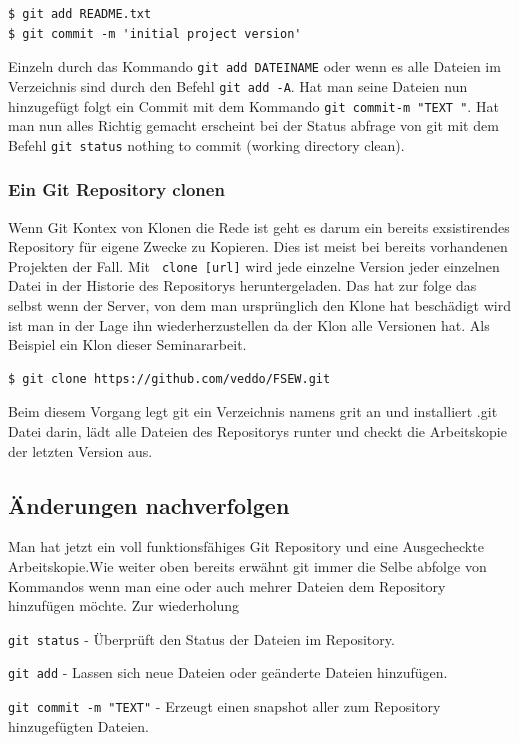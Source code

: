 \documentclass[12pt,a4paper,bibliography=totocnumbered,listof=totocnumbered]{scrartcl}
\begin{document}
 \vspace{1em}
\begin{lstlisting}[caption=Git Repository Dateien hinzufügen, label=lst:arduino]
$ git add README.txt
$ git commit -m 'initial project version'

\end{lstlisting}


Einzeln durch das Kommando \lstinline|git add DATEINAME| oder wenn es alle Dateien im Verzeichnis sind durch den Befehl \lstinline|git add -A|. Hat man seine Dateien nun hinzugefügt folgt ein Commit mit dem Kommando \lstinline|git commit-m "TEXT "|. Hat man nun alles Richtig gemacht erscheint bei der Status abfrage von git mit dem Befehl \lstinline|git status| nothing to commit (working directory clean).


\subsubsection{Ein Git Repository clonen}
Wenn Git Kontex von Klonen die Rede ist geht es darum ein bereits exsistirendes Repository für eigene Zwecke zu Kopieren. Dies ist meist bei bereits vorhandenen Projekten der Fall. Mit \lstinline| clone [url]| wird jede einzelne Version jeder einzelnen Datei in der Historie des Repositorys heruntergeladen. Das hat zur folge das selbst wenn der Server, von dem man ursprünglich den Klone hat beschädigt wird ist man in der Lage ihn wiederherzustellen da der Klon alle Versionen hat. Als Beispiel ein Klon dieser Seminararbeit.

    \vspace{1em}
\begin{lstlisting}[caption=Git Repository Klonen, label=lst:arduino]
$ git clone https://github.com/veddo/FSEW.git
\end{lstlisting}

Beim diesem Vorgang legt git ein Verzeichnis namens grit an und installiert .git Datei darin, lädt alle Dateien des Repositorys runter und checkt die Arbeitskopie der letzten Version aus.




\subsection{ Änderungen nachverfolgen}
 Man hat jetzt ein voll funktionsfähiges Git Repository und eine Ausgecheckte Arbeitskopie.Wie weiter oben bereits erwähnt git immer die Selbe abfolge von Kommandos wenn man eine oder auch mehrer Dateien dem Repository hinzufügen möchte. Zur wiederholung
\begin{compactitem}
	\item \lstinline|git status| - Überprüft den Status der Dateien im Repository.
	\item \lstinline|git add| - Lassen sich neue Dateien oder geänderte Dateien hinzufügen. 
	\item \lstinline|git commit -m "TEXT"| - Erzeugt einen snapshot aller zum Repository hinzugefügten Dateien.
\end{compactitem}
\end{document}
